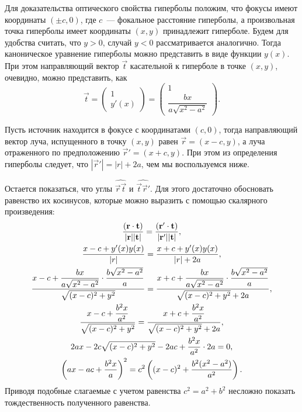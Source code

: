 Для доказательства оптического свойства гиперболы положим, что фокусы имеют координаты $(\pm c, 0)$, где $c$~--- фокальное расстояние гиперболы, а произвольная точка гиперболы имеет координаты $(x, y)$ принадлежит гиперболе. Будем для удобства считать, что $y > 0$, случай $y < 0$ рассматривается аналогично. Тогда каноническое уравнение гиперболы можно представить в виде функции $y(x)$. При этом направляющий вектор $\vec t$ касательной к гиперболе в точке $(x, y)$, очевидно, можно представить, как
\begin{equation*}
	\vec t = 
	\begin{pmatrix}
		1\\
		y'(x)
	\end{pmatrix} = 
	\begin{pmatrix}
		1\\
		\dfrac{bx}{a \sqrt{x^2 - a^2}}
	\end{pmatrix}.
\end{equation*}

Пусть источник находится в фокусе с координатами $(c, 0)$, тогда направляющий вектор луча, испущенного в точку $(x, y)$ равен $\vec r = (x - c, y)$, а луча отраженного по предположению $\vec r' = (x + c, y)$. При этом из определения гиперболы следует, что $|\vec r'| = |r| + 2a$, чем мы воспользуемся ниже. 

Остается показаться, что углы $\widehat{\vec r \vec t}$ и $\widehat{\vec t \vec r'}$. Для этого достаточно обосновать равенство их косинусов, которые можно выразить с помощью скалярного произведения:
\begin{gather*}
	\frac{ \left(\mathbf{r} \cdot \mathbf{t}\right)}{|\mathbf{r}| | \mathbf{t} |} = \frac{ \left(\mathbf{r'} \cdot \mathbf{t}\right)}{|\mathbf{r}'| | \mathbf{t} |},\\
	\frac{ x - c + y'(x)y(x)}{|r|} = \frac{x + c + y'(x) y(x)}{|r| + 2a},\\
	\frac{ x - c + \dfrac{bx}{a \sqrt{x^2-a^2}} \cdot \dfrac{b\sqrt{x^2 - a^2}}{a}}{\sqrt{(x - c)^2 + y^2}} = \frac{ x + c + \dfrac{bx}{a \sqrt{x^2-a^2}} \cdot \dfrac{b\sqrt{x^2 - a^2}}{a}}{\sqrt{(x - c)^2 + y^2} + 2a},\\
	\frac{ x - c + \dfrac{b^2 x }{a^2}}{\sqrt{(x - c)^2 + y^2}} = \frac{ x + c + \dfrac{b^2 x }{a^2}}{\sqrt{(x - c)^2 + y^2} + 2a},\\
	2ax - 2c\sqrt{(x - c )^2 + y^2} - 2ac + \frac{b^2 x}{a^2} \cdot 2a = 0,\\
	\left( ax - ac + \frac{b^2 x}{a} \right)^2 = c^2 \left( (x-c)^2 + \frac{b^2 (x^2 - a^2)}{a^2} \right).
\end{gather*}
Приводя подобные слагаемые с учетом равенства $c^2 = a^2 + b^2$ несложно показать тождественность полученного равенства.

